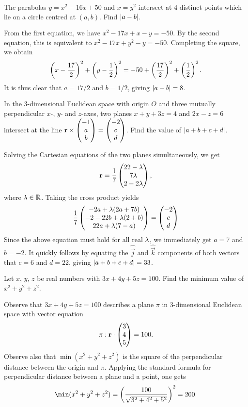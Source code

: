 \begin{question}[8]\label{A::2023-O-1-7}
    The parabolas $y = x^2 - 16x + 50$ and $x = y^2$ intersect at 4 distinct points which lie on a circle centred at $(a, b)$. Find $\left\lvert a - b \right\rvert$.
\end{question}
\begin{solution*}
    From the first equation, we have $x^2 - 17x + x - y = -50$. By the second equation, this is equivalent to $x^2 - 17x + y^2 - y = -50$. Completing the square, we obtain \[\left( x - \frac{17}2 \right)^2 + \left( y - \frac12 \right)^2 = -50 + \left( \frac{17}{2} \right)^2 + \left( \frac12 \right)^2.\] It is thus clear that $a = 17/2$ and $b = 1/2$, giving $\left\lvert a - b \right\rvert = 8$.
\end{solution*}

\begin{question}[33]\label{A::2023-O-1-8}
    In the 3-dimensional Euclidean space with origin $O$ and three mutually perpendicular $x$-, $y$- and $z$-axes, two planes $x + y + 3z = 4$ and $2x - z = 6$ intersect at the line $\mathbf{r} \times \begin{pmatrix} -1 \\ a \\ b \end{pmatrix} = \begin{pmatrix} -2 \\ c \\ d \end{pmatrix}$. Find the value of $\left\lvert a + b + c + d \right\rvert$.
\end{question}
\begin{solution*}
    Solving the Cartesian equations of the two planes simultaneously, we get \[\mathbf{r} = \dfrac17 \begin{pmatrix} 22-\lambda \\ 7\lambda \\ 2-2\lambda \end{pmatrix},\] where $\lambda \in \mathbb{R}$. Taking the cross product yields \[\dfrac17 \begin{pmatrix} -2a + \lambda(2a+7b) \\ -2-22b + \lambda(2+b) \\ 22a+\lambda(7-a) \end{pmatrix} = \begin{pmatrix} -2 \\ c \\ d \end{pmatrix}\] Since the above equation must hold for all real $\lambda$, we immediately get $a = 7$ and $b = -2$. It quickly follows by equating the $\hat {\vec j}$ and $\hat{\vec k}$ components of both vectors that $c = 6$ and $d = 22$, giving $\left\lvert a + b + c + d \right\rvert = 33$.
\end{solution*}

\begin{question}[200]\label{A::2023-O-1-9}
    Let $x$, $y$, $z$ be real numbers with $3x + 4y + 5z = 100$. Find the minimum value of $x^2 + y^2 + z^2$.
\end{question}
\begin{solution*}
    Observe that $3x + 4y + 5z = 100$ describes a plane $\pi$ in 3-dimensional Euclidean space with vector equation \[\pi: \mathbf{r} \cdot \begin{pmatrix} 3 \\ 4 \\ 5 \end{pmatrix} = 100.\] Observe also that $\min(x^2 + y^2 + z^2)$ is the square of the perpendicular distance between the origin and $\pi$. Applying the standard formula for perpendicular distance between a plane and a point, one gets \[\min(x^2 + y^2 + z^2) = \bp{\dfrac{100}{\sqrt{3^2 + 4^2 + 5^2}}}^2 = 200.\]
\end{solution*}

